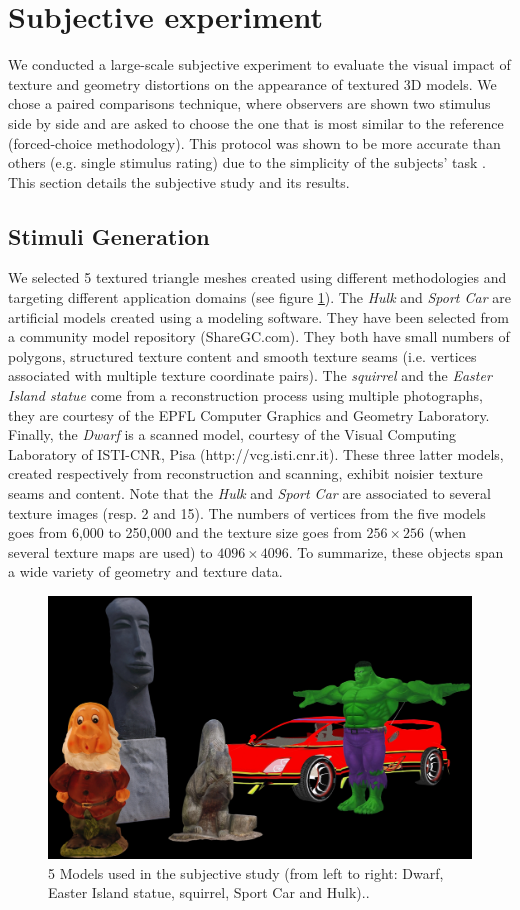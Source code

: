 \section{Subjective experiment}
We conducted a large-scale subjective experiment to evaluate the visual impact of texture and geometry distortions on the appearance of textured 3D models. We chose a paired comparisons technique, where observers are shown two stimulus side by side and are asked to choose the one that is most similar to the reference (forced-choice methodology). This protocol was shown to be more accurate than others (e.g. single stimulus rating) due to the simplicity of the subjects’ task \cite{Mantiuk2012}. This section details the subjective study and its results.

\subsection{Stimuli Generation}
We selected 5 textured triangle meshes created using different methodologies and targeting different application domains (see figure \ref{fig-ref}). The \textit{Hulk} and \textit{Sport Car} are artificial models created using a modeling software. They have been selected from a community model repository (ShareGC.com). They both have small numbers of polygons, structured texture content and smooth texture seams (i.e. vertices associated with multiple texture coordinate pairs). The \textit{squirrel} and the \textit{Easter Island statue} come from a reconstruction process using multiple photographs, they are courtesy of the EPFL Computer Graphics and Geometry Laboratory. Finally, the \textit{Dwarf} is a scanned model, courtesy of the Visual Computing Laboratory of ISTI-CNR, Pisa (http://vcg.isti.cnr.it). These three latter models, created respectively from reconstruction and scanning, exhibit noisier texture seams and content. Note that the \textit{Hulk} and \textit{Sport Car} are associated to several texture images (resp. 2 and 15). The numbers of vertices from the five models goes from 6,000 to 250,000 and the texture size goes from $256\times256$ (when several texture maps are used) to $4096\times4096$.  To summarize, these objects span a wide variety of geometry and texture data.\\
\begin{figure}
  \centering
  \includegraphics[width=.7\linewidth]{allmodels.png}
  \caption{\label{fig-ref} 5 Models used in the subjective study (from left to right: Dwarf, Easter Island statue, squirrel, Sport Car and Hulk)..}
  \end{figure}
